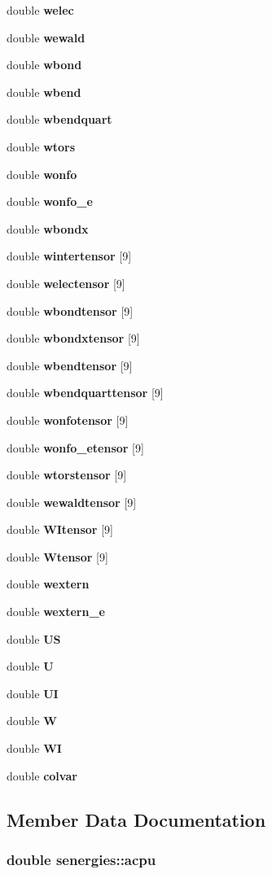 \begin{CompactItemize}
double {\bf welec}
\item 
double {\bf wewald}
\item 
double {\bf wbond}
\item 
double {\bf wbend}
\item 
double {\bf wbendquart}
\item 
double {\bf wtors}
\item 
double {\bf wonfo}
\item 
double {\bf wonfo\_\-e}
\item 
double {\bf wbondx}
\item 
double {\bf wintertensor} [9]
\item 
double {\bf welectensor} [9]
\item 
double {\bf wbondtensor} [9]
\item 
double {\bf wbondxtensor} [9]
\item 
double {\bf wbendtensor} [9]
\item 
double {\bf wbendquarttensor} [9]
\item 
double {\bf wonfotensor} [9]
\item 
double {\bf wonfo\_\-etensor} [9]
\item 
double {\bf wtorstensor} [9]
\item 
double {\bf wewaldtensor} [9]
\item 
double {\bf WItensor} [9]
\item 
double {\bf Wtensor} [9]
\item 
double {\bf wextern}
\item 
double {\bf wextern\_\-e}
\item 
double {\bf US}
\item 
double {\bf U}
\item 
double {\bf UI}
\item 
double {\bf W}
\item 
double {\bf WI}
\item 
double {\bf colvar}
\end{CompactItemize}


\subsection{Member Data Documentation}
\subsubsection{\setlength{\rightskip}{0pt plus 5cm}double {\bf senergies::acpu}}\label{structsenergies_ede3ef90e12dcf6a767a338c069461d6}


